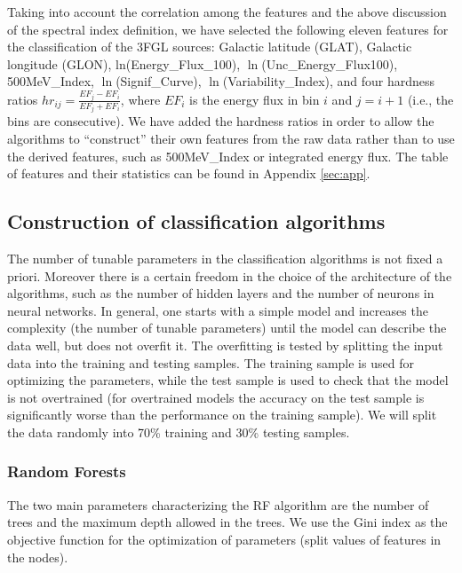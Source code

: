 Taking into account the correlation among the features and the above discussion of the spectral index definition,
we have selected the following eleven features for the classification of the 3FGL sources:
Galactic latitude (GLAT), Galactic longitude (GLON), ln(Energy\_Flux\_100), $\ln$(Unc\_Energy\_Flux100), 500MeV\_Index, $\ln$(Signif\_Curve), 
$\ln$(Variability\_Index), and four hardness ratios $hr_{ij} = \frac{EF_j - EF_i}{EF_j + EF_i}$, where $EF_i$ is the energy flux in bin $i$
and $j = i + 1$ (i.e., the bins are consecutive).
We have added the hardness ratios in order to allow the algorithms to ``construct'' their own features from the raw data rather than to use the 
derived features, such as 500MeV\_Index or integrated energy flux.
The table of features and their statistics can be found in Appendix \ref{sec:app}.






\subsection{Construction of classification algorithms}

The number of tunable parameters in the classification algorithms is not fixed a priori. 
Moreover there is a certain freedom in the choice of the architecture of the algorithms, such as
the number of hidden layers and the number of neurons in neural networks.
In general, one starts with a simple model and increases the complexity (the number of tunable parameters)
until the model can describe the data well, but does not overfit it.
The overfitting is tested by splitting the input data into the training and testing samples.
The training sample is used for optimizing the parameters,
while the test sample is used to check that the model is not overtrained (for overtrained models the accuracy on the test
sample is significantly worse than the performance on the training sample).
We will split the data randomly into 70\% training and 30\% testing samples.



\subsubsection{Random Forests}

The two main parameters characterizing the RF algorithm are the number of trees and the maximum depth allowed in the trees. 
We use the Gini index as the objective function for the optimization of parameters (split values of features in the nodes).

